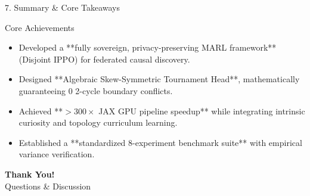 \documentclass[aspectratio=169, 10pt]{beamer}
\begin{document}
\begin{frame}{7. Summary \& Core Takeaways}
  \begin{block}{Core Achievements}
    \begin{itemize}
      \item Developed a **fully sovereign, privacy-preserving MARL framework** (Disjoint IPPO) for federated causal discovery.
      \item Designed **Algebraic Skew-Symmetric Tournament Head**, mathematically guaranteeing 0 2-cycle boundary conflicts.
      \item Achieved **$>300\times$ JAX GPU pipeline speedup** while integrating intrinsic curiosity and topology curriculum learning.
      \item Established a **standardized 8-experiment benchmark suite** with empirical variance verification.
    \end{itemize}
  \end{block}

  \begin{center}
    \Large \textbf{Thank You!} \\
    \small Questions \& Discussion
  \end{center}
\end{frame}
\end{document}
